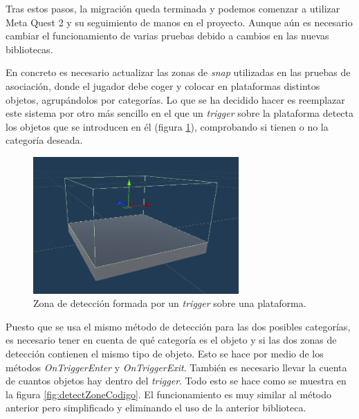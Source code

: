 Tras estos pasos, la migración queda terminada y podemos comenzar a utilizar Meta Quest 2 y su seguimiento de manos en el proyecto. Aunque aún es necesario cambiar el funcionamiento de varias pruebas debido a cambios en las nuevas bibliotecas.


En concreto es necesario actualizar las zonas de \textit{snap} utilizadas en las pruebas de asociación, donde el jugador debe coger y colocar en plataformas distintos objetos, agrupándolos por categorías. Lo que se ha decidido hacer es reemplazar este sistema por otro más sencillo en el que un \textit{trigger} sobre la plataforma detecta los objetos que se introducen en él (figura \ref{fig:detectZone}), comprobando si tienen o no la categoría deseada. 


\begin{figure}
	\centering
	\includegraphics[width=0.7\textwidth]{04.Desarrollo/05.Entrega5/01.Iteracion5_1/00.Figuras/07.detect_zone.png}
	\caption{Zona de detección formada por un \textit{trigger} sobre una plataforma.}
	\label{fig:detectZone}
\end{figure}

Puesto que se usa el mismo método de detección para las dos posibles categorías, es necesario tener en cuenta de qué categoría es el objeto y si las dos zonas de detección contienen el mismo tipo de objeto. Esto se hace por medio de los métodos \textit{OnTriggerEnter} y \textit{OnTriggerExit}. También es necesario llevar la cuenta de cuantos objetos hay dentro del \textit{trigger}. Todo esto se hace como se muestra en la figura \ref{fig:detectZoneCodigo}. El funcionamiento es muy similar al método anterior pero simplificado y eliminando el uso de la anterior biblioteca.



